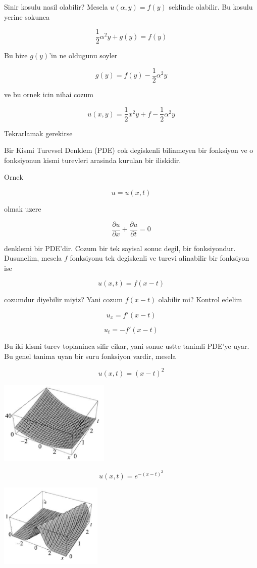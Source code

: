 \documentclass[12pt,fleqn]{article}
\begin{document}
Sinir kosulu nasil olabilir? Mesela $u(\alpha,y) = f(y)$ seklinde
olabilir. Bu kosulu yerine sokunca

\[ \frac{1}{2}\alpha^2 y + g(y) = f(y) \]

Bu bize $g(y)$'in ne oldugunu soyler

\[ g(y)  = f(y) - \frac{1}{2}\alpha^2 y \]

ve bu ornek icin nihai cozum

\[ u(x,y) = \frac{1}{2}x^2y + f - \frac{1}{2}\alpha^2 y \]

Tekrarlamak gerekirse

Bir Kismi Turevsel Denklem (PDE) cok degiskenli bilinmeyen bir fonksiyon ve
o fonksiyonun kismi turevleri arasinda kurulan bir iliskidir. 

Ornek 

\[ u = u(x,t) \]

olmak uzere

\[ \frac{\partial u}{\partial x} + \frac{\partial u}{\partial t} = 0\]

denklemi bir PDE'dir. Cozum bir tek sayisal sonuc degil, bir
fonksiyondur. Dusunelim, mesela $f$ fonksiyonu tek degiskenli ve turevi
alinabilir bir fonksiyon ise

\[ u(x,t) = f(x-t) \]

cozumdur diyebilir miyiz? Yani cozum $f(x-t)$ olabilir mi? Kontrol edelim 

\[ u_x = f'(x-t) \]

\[ u_t = -f'(x-t) \]

Bu iki kismi turev toplaninca sifir cikar, yani sonuc ustte tanimli PDE'ye
uyar. Bu genel tanima uyan bir suru fonksiyon vardir, mesela 

\[ u(x,t) = (x-t)^2 \]

\includegraphics[height=4cm]{1_1.png}

\[ u(x,t) = e^{-(x-t)^2} \]

\includegraphics[height=4cm]{1_2.png}
\end{document}
